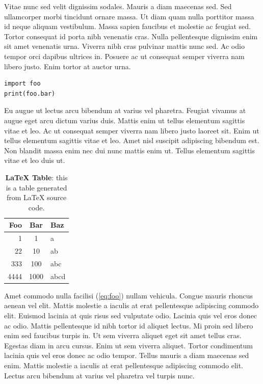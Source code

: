 \label{sec:methods}

Vitae nunc sed velit dignissim sodales. Mauris a diam maecenas sed. Sed
ullamcorper morbi tincidunt ornare massa. Ut diam quam nulla porttitor
massa id neque aliquam vestibulum. Massa sapien faucibus et molestie ac
feugiat sed. Tortor consequat id porta nibh venenatis cras. Nulla
pellentesque dignissim enim sit amet venenatis urna. Viverra nibh cras
pulvinar mattis nunc sed. Ac odio tempor orci dapibus ultrices in.
Posuere ac ut consequat semper viverra nam libero justo. Enim tortor at
auctor urna.

\begin{verbatim}
import foo
print(foo.bar)
\end{verbatim}

Eu augue ut lectus arcu bibendum at varius vel pharetra. Feugiat vivamus
at augue eget arcu dictum varius duis. Mattis enim ut tellus elementum
sagittis vitae et leo. Ac ut consequat semper viverra nam libero justo
laoreet sit. Enim ut tellus elementum sagittis vitae et leo. Amet nisl
suscipit adipiscing bibendum est. Non blandit massa enim nec dui nunc
mattis enim ut. Tellus elementum sagittis vitae et leo duis ut.

\begin{table}[t!]
\center
\small
\begin{tabular}{rcl}
\toprule
Foo & Bar & Baz \\
\midrule
1 & 1 & a \\
22 & 10 & ab \\
333 & 100 & abc \\
4444 & 1000 & abcd \\
\bottomrule
\end{tabular}
\caption{
\textbf{\LaTeX{} Table}: this is a table generated from \LaTeX{} source
code.
}
\label{tab:latex}
\end{table}

Amet commodo nulla facilisi (\ref{eq:foo}) nullam vehicula. Congue
mauris rhoncus aenean vel elit. Mattis molestie a iaculis at erat
pellentesque adipiscing commodo elit. Euismod lacinia at quis risus sed
vulputate odio. Lacinia quis vel eros donec ac odio. Mattis pellentesque
id nibh tortor id aliquet lectus. Mi proin sed libero enim sed faucibus
turpis in. Ut sem viverra aliquet eget sit amet tellus cras. Egestas
diam in arcu cursus. Enim ut sem viverra aliquet. Tortor condimentum
lacinia quis vel eros donec ac odio tempor. Tellus mauris a diam
maecenas sed enim. Mattis molestie a iaculis at erat pellentesque
adipiscing commodo elit. Lectus arcu bibendum at varius vel pharetra vel
turpis nunc.

